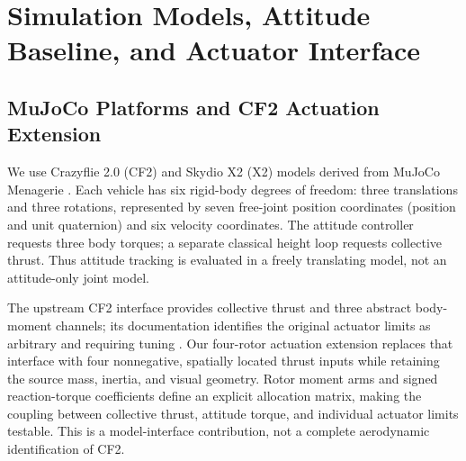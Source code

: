 \documentclass[letterpaper,10pt,conference]{IEEEtran}
\begin{document}
\section{Simulation Models, Attitude Baseline, and Actuator Interface}
\label{sec:problem}

\subsection{MuJoCo Platforms and CF2 Actuation Extension}
We use Crazyflie 2.0 (CF2) and Skydio X2 (X2) models derived from MuJoCo
Menagerie \cite{menagerieModels}. Each vehicle has six rigid-body degrees of freedom: three
translations and three rotations, represented by seven free-joint position
coordinates (position and unit quaternion) and six velocity coordinates.
The attitude controller requests three body torques; a separate classical
height loop requests collective thrust. Thus attitude tracking is evaluated
in a freely translating model, not an attitude-only joint model.

The upstream CF2 interface provides collective thrust and three abstract
body-moment channels; its documentation identifies the original actuator
limits as arbitrary and requiring tuning \cite{menagerieCF2}. Our four-rotor actuation extension replaces that
interface with four nonnegative, spatially located thrust inputs while
retaining the source mass, inertia, and visual geometry. Rotor moment arms
and signed reaction-torque coefficients define an explicit allocation
matrix, making the coupling between collective thrust, attitude torque,
and individual actuator limits testable. This is a model-interface
contribution, not a complete aerodynamic identification of CF2.
\end{document}
